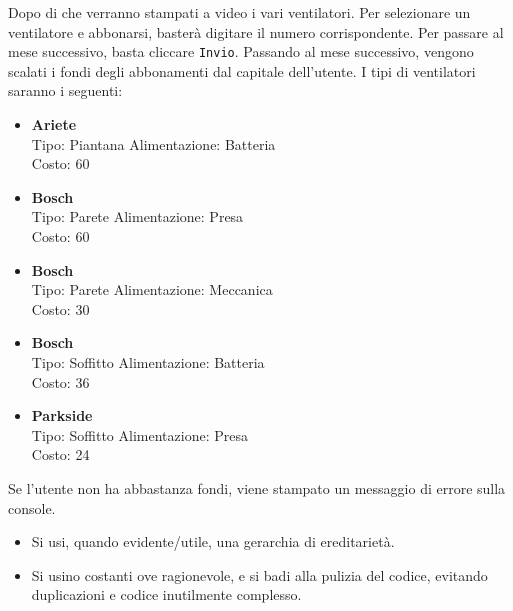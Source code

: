 \documentclass{article}
\begin{document}
\newline
Dopo di che verranno stampati a video i vari ventilatori.
Per selezionare un ventilatore e abbonarsi, basterà digitare il numero corrispondente.
Per passare al mese successivo, basta cliccare \texttt{Invio}.
Passando al mese successivo, vengono scalati i fondi degli abbonamenti dal capitale dell'utente.
\newline
I tipi di ventilatori saranno i seguenti:
\begin{itemize}
    \item \textbf{Ariete} \\
    Tipo: Piantana Alimentazione: Batteria \\
    Costo: 60
    \item \textbf{Bosch} \\
    Tipo: Parete Alimentazione: Presa \\
    Costo: 60
    \item \textbf{Bosch} \\
    Tipo: Parete Alimentazione: Meccanica \\
    Costo: 30
    \item \textbf{Bosch} \\
    Tipo: Soffitto Alimentazione: Batteria \\
    Costo: 36
    \item \textbf{Parkside} \\
    Tipo: Soffitto Alimentazione: Presa \\
    Costo: 24
\end{itemize}
Se l'utente non ha abbastanza fondi, viene stampato un messaggio di errore sulla console.
\begin{itemize}
    \item Si usi, quando evidente/utile, una gerarchia di ereditarietà.
    \item Si usino costanti ove ragionevole, e si badi alla pulizia del codice, evitando duplicazioni e codice inutilmente complesso.
\end{itemize}
\end{document}
